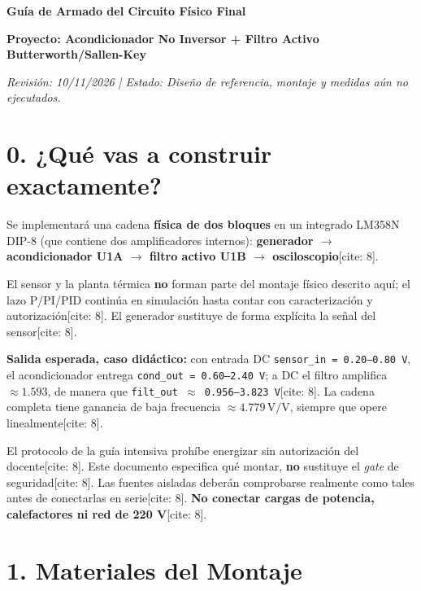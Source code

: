 \documentclass[11pt, a4paper]{article}
\begin{document}
\begin{center}
    {\LARGE \textbf{Guía de Armado del Circuito Físico Final}}
    \par\vspace{0.2cm}
    {\large \textbf{Proyecto: Acondicionador No Inversor + Filtro Activo Butterworth/Sallen-Key}}
    \par\vspace{0.1cm}
    \textit{Revisión: 10/11/2026 | Estado: Diseño de referencia, montaje y medidas aún no ejecutados.}
\end{center}

\section{0. ¿Qué vas a construir exactamente?}
Se implementará una cadena \textbf{física de dos bloques} en un integrado LM358N DIP-8 (que contiene dos amplificadores internos): \textbf{generador $\to$ acondicionador U1A $\to$ filtro activo U1B $\to$ osciloscopio}[cite: 8]. 

El sensor y la planta térmica \textbf{no} forman parte del montaje físico descrito aquí; el lazo P/PI/PID continúa en simulación hasta contar con caracterización y autorización[cite: 8]. El generador sustituye de forma explícita la señal del sensor[cite: 8].

\textbf{Salida esperada, caso didáctico:} con entrada DC \texttt{sensor\_in = 0.20--0.80 V}, el acondicionador entrega \texttt{cond\_out = 0.60--2.40 V}; a DC el filtro amplifica $\approx 1.593$, de manera que \texttt{filt\_out $\approx$ 0.956--3.823 V}[cite: 8]. La cadena completa tiene ganancia de baja frecuencia $\approx 4.779\,\text{V/V}$, siempre que opere linealmente[cite: 8].

\begin{tcolorbox}[colback=red!5, colframe=red!80!black, title=\textbf{ATENCIÓN: Criterio de Seguridad de Energización}]
    El protocolo de la guía intensiva prohíbe energizar sin autorización del docente[cite: 8]. Este documento especifica qué montar, \textbf{no} sustituye el \textit{gate} de seguridad[cite: 8]. Las fuentes aisladas deberán comprobarse realmente como tales antes de conectarlas en serie[cite: 8]. \textbf{No conectar cargas de potencia, calefactores ni red de 220 V}[cite: 8].
\end{tcolorbox}

\section{1. Materiales del Montaje}
\end{document}
